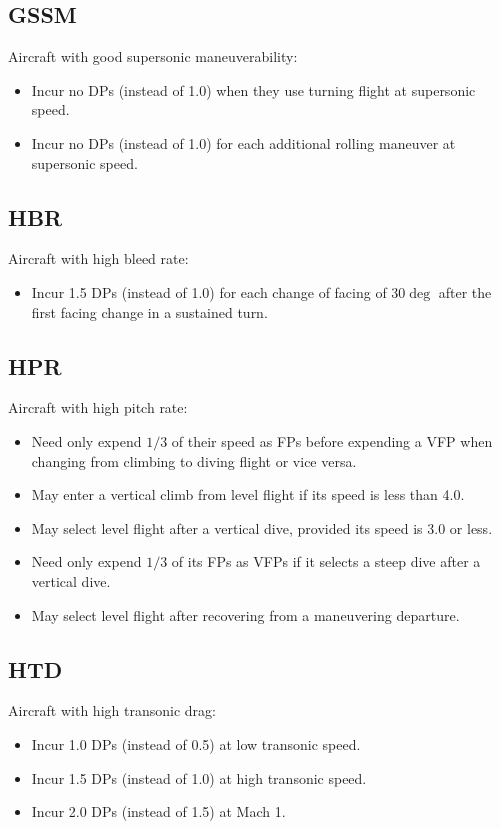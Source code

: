 \documentclass[10pt]{extarticle}
\begin{document}
\subsection{GSSM} Aircraft with good supersonic maneuverability:
\begin{itemize}
    \item Incur no DPs (instead of 1.0) when they use turning flight at supersonic speed.
    \item Incur no DPs (instead of 1.0) for each additional rolling maneuver at supersonic speed.
\end{itemize}

\subsection{HBR} Aircraft with high bleed rate:
\begin{itemize}
    \item Incur 1.5 DPs (instead of 1.0) for each change of facing of $30\deg$ after the first facing change in a sustained turn.
\end{itemize}

\subsection{HPR} Aircraft with high pitch rate:
\begin{itemize}
    \item Need only expend $1/3$ of their speed as FPs before expending a VFP when changing from climbing to diving flight or vice versa.
    \item May enter a vertical climb from level flight if its speed is less than 4.0.
    \item May select level flight after a vertical dive, provided its speed is 3.0 or less.
    \item Need only expend $1/3$ of its FPs as VFPs if it selects a steep dive after a vertical dive.
    \item May select level flight after recovering from a maneuvering departure.
\end{itemize}

\subsection{HTD} Aircraft with high transonic drag:
\begin{itemize}
    \item Incur 1.0 DPs (instead of 0.5) at low transonic speed.
    \item Incur 1.5 DPs (instead of 1.0) at high transonic speed.
    \item Incur 2.0 DPs (instead of 1.5) at Mach 1.
\end{itemize}
\end{document}
